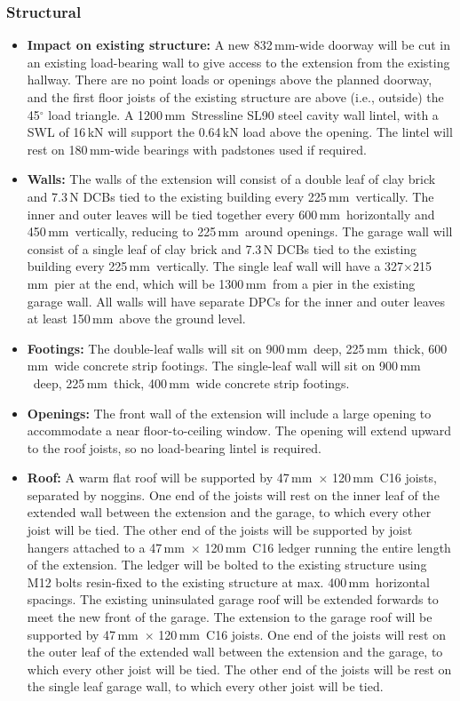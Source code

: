 \documentclass{extension}
\newcommand{\mm}{\,$\mathrm{mm}$}
\begin{document}
\subsubsection{Structural}
\begin{itemize}
  \item {\bf Impact on existing structure:} A new 832\mm -wide doorway will be cut in an existing load-bearing wall to give access to the extension from the existing hallway. There are no point loads or openings above the planned doorway, and the first floor joists of the existing structure are above (i.e., outside) the 45$^\circ$ load triangle. A 1200\mm\ Stressline SL90 steel cavity wall lintel, with a SWL of 16\,kN will support the 0.64\,kN load above the opening. The lintel will rest on 180\mm -wide bearings with padstones used if required.
  \item {\bf Walls:} The walls of the extension will consist of a double leaf of clay brick and 7.3\,N DCBs tied to the existing building every 225\mm\ vertically. The inner and outer leaves will be tied together every 600\mm\ horizontally and 450\mm\ vertically, reducing to 225\mm\ around openings. The garage wall will consist of a single leaf of clay brick and 7.3\,N DCBs tied to the existing building every 225\mm\ vertically. The single leaf wall will have a 327$\times$215\mm\ pier at the end, which will be 1300\mm\ from a pier in the existing garage wall. All walls will have separate DPCs for the inner and outer leaves at least 150\mm\ above the ground level.
  \item {\bf Footings:} The double-leaf walls will sit on 900\mm\ deep, 225\mm\ thick, 600\mm\ wide concrete strip footings. The single-leaf wall will sit on 900\mm\ deep, 225\mm\ thick, 400\mm\ wide concrete strip footings.
  \item {\bf Openings:} The front wall of the extension will include a large opening to accommodate a near floor-to-ceiling window. The opening will extend upward to the roof joists, so no load-bearing lintel is required.
  \item {\bf Roof:} A warm flat roof will be supported by 47\mm\ $\times$ 120\mm\ C16 joists, separated by noggins. One end of the joists will rest on the inner leaf of the extended wall between the extension and the garage, to which every other joist will be tied. The other end of the joists will be supported by joist hangers attached to a 47\mm\ $\times$ 120\mm\ C16 ledger running the entire length of the extension. The ledger will be bolted to the existing structure using M12 bolts resin-fixed to the existing structure at max. 400\mm\ horizontal spacings. The existing uninsulated garage roof will be extended forwards to meet the new front of the garage. The extension to the garage roof will be supported by 47\mm\ $\times$ 120\mm\ C16 joists. One end of the joists will rest on the outer leaf of the extended wall between the extension and the garage, to which every other joist will be tied. The other end of the joists will be rest on the single leaf garage wall, to which every other joist will be tied.

\end{itemize}
\end{document}
